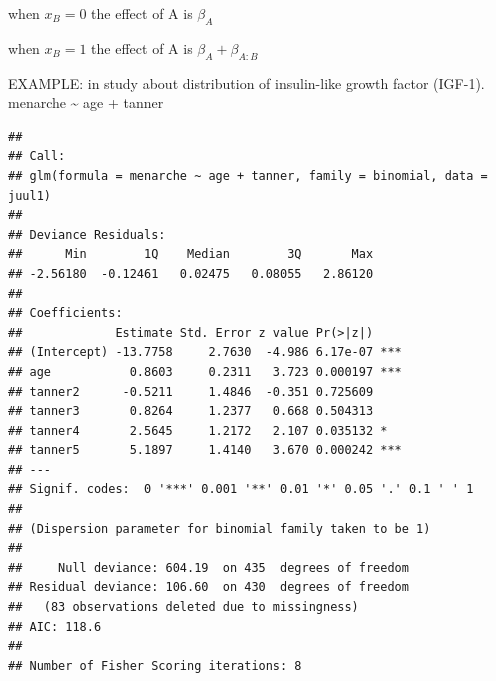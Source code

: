 \documentclass[
]{article}
\newenvironment{Shaded}{\begin{snugshade}}{\end{snugshade}}
\newcommand{\DataTypeTok}[1]{\textcolor[rgb]{0.13,0.29,0.53}{#1}}
\newcommand{\DecValTok}[1]{\textcolor[rgb]{0.00,0.00,0.81}{#1}}
\newcommand{\KeywordTok}[1]{\textcolor[rgb]{0.13,0.29,0.53}{\textbf{#1}}}
\newcommand{\NormalTok}[1]{#1}
\newcommand{\OperatorTok}[1]{\textcolor[rgb]{0.81,0.36,0.00}{\textbf{#1}}}
\newcommand{\StringTok}[1]{\textcolor[rgb]{0.31,0.60,0.02}{#1}}
\begin{document}
when \(x_B= 0\) the effect of A is \(\beta_A\)

when \(x_B= 1\) the effect of A is \(\beta_A + \beta_{A:B}\)

EXAMPLE: in study about distribution of insulin-like growth factor
(IGF-1). menarche \textasciitilde{} age + tanner

\begin{Shaded}
\end{Shaded}

\begin{verbatim}
## 
## Call:
## glm(formula = menarche ~ age + tanner, family = binomial, data = juul1)
## 
## Deviance Residuals: 
##      Min        1Q    Median        3Q       Max  
## -2.56180  -0.12461   0.02475   0.08055   2.86120  
## 
## Coefficients:
##             Estimate Std. Error z value Pr(>|z|)    
## (Intercept) -13.7758     2.7630  -4.986 6.17e-07 ***
## age           0.8603     0.2311   3.723 0.000197 ***
## tanner2      -0.5211     1.4846  -0.351 0.725609    
## tanner3       0.8264     1.2377   0.668 0.504313    
## tanner4       2.5645     1.2172   2.107 0.035132 *  
## tanner5       5.1897     1.4140   3.670 0.000242 ***
## ---
## Signif. codes:  0 '***' 0.001 '**' 0.01 '*' 0.05 '.' 0.1 ' ' 1
## 
## (Dispersion parameter for binomial family taken to be 1)
## 
##     Null deviance: 604.19  on 435  degrees of freedom
## Residual deviance: 106.60  on 430  degrees of freedom
##   (83 observations deleted due to missingness)
## AIC: 118.6
## 
## Number of Fisher Scoring iterations: 8
\end{verbatim}
\end{document}
